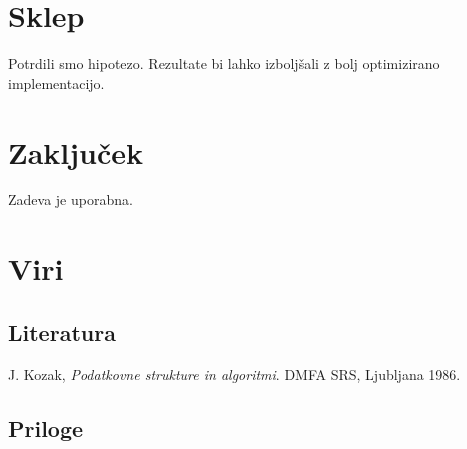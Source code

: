 \documentclass[a4paper,oneside,10pt]{article}
\begin{document}
\section{Sklep}
Potrdili smo hipotezo. Rezultate bi lahko izboljšali z bolj optimizirano implementacijo.
\section{Zaključek}
Zadeva je uporabna.
\section{Viri}
\subsection{Literatura}
\vspace{-1cm}
\begin{thebibliography}{99}
   {J. Kozak, \emph{Podatkovne strukture in algoritmi}. DMFA SRS, Ljubljana 1986. }
\end{thebibliography}
\subsection{Priloge}
\end{document}
